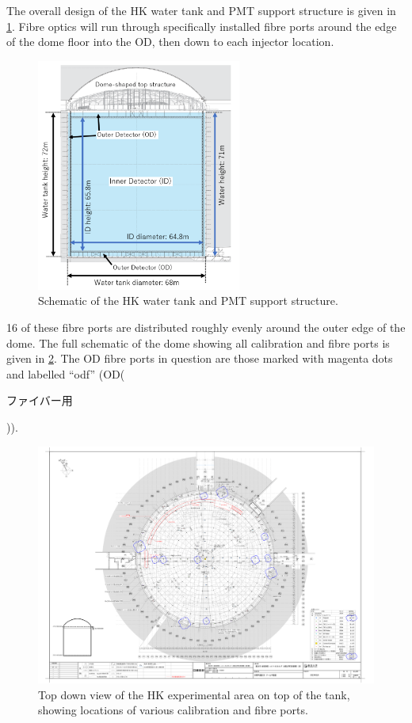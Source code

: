\documentclass[a4paper,11pt]{article}
\begin{document}
The overall design of the HK water tank and PMT support structure is given in \cref{fig:HKtank}. Fibre optics will run through specifically installed fibre ports around the edge of the dome floor into the OD, then down to each injector location.
\begin{figure}[h]
\centering
\includegraphics[width=0.6\textwidth]{HKdiagram.png}
\caption{Schematic of the HK water tank and PMT support structure. \cite{bib:tn0048}}\label{fig:HKtank}
\end{figure}
16 of these fibre ports are distributed roughly evenly around the outer edge of the dome. The full schematic of the dome showing all calibration and fibre ports is given in \cref{fig:ports}. The OD fibre ports in question are those marked with magenta dots and labelled ``odf'' (OD(\begin{CJK*}{UTF8}{min}ファイバー用\end{CJK*})).
\begin{figure}[h]
\centering
\includegraphics[angle=90,width=\textwidth]{portMap}
\caption{Top down view of the HK experimental area on top of the tank, showing locations of various calibration and fibre ports.}\label{fig:ports}
\end{figure}
\end{document}
